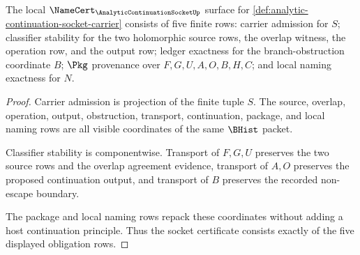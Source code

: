 \begin{theorem}
\label{thm:analytic-continuation-socket-namecert-obligations}
The local $\NameCert_{\AnalyticContinuationSocketUp}$ surface for \autoref{def:analytic-continuation-socket-carrier} consists of five finite rows: carrier admission for $S$; classifier stability for the two holomorphic source rows, the overlap witness, the operation row, and the output row; ledger exactness for the branch-obstruction coordinate $B$; $\Pkg$ provenance over $F,G,U,A,O,B,H,C$; and local naming exactness for $N$.
\end{theorem}
\begin{proof}
Carrier admission is projection of the finite tuple $S$. The source, overlap, operation, output, obstruction, transport, continuation, package, and local naming rows are all visible coordinates of the same $\BHist$ packet.

Classifier stability is componentwise. Transport of $F,G,U$ preserves the two source rows and the overlap agreement evidence, transport of $A,O$ preserves the proposed continuation output, and transport of $B$ preserves the recorded non-escape boundary.

The package and local naming rows repack these coordinates without adding a host continuation principle. Thus the socket certificate consists exactly of the five displayed obligation rows.
\end{proof}

